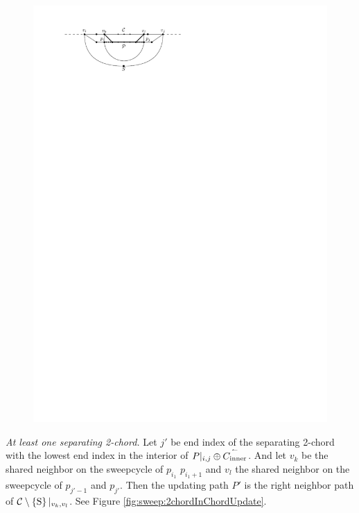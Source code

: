     \begin{figure}[h]
      \centering
      \includegraphics[scale=1]{unifiedAlgo/img/sweep/chordUpdate}
      \caption{}
      \label{fig:sweep:chordUpdate}
    \end{figure}

    \emph{At least one separating 2-chord.}
      Let $j'$ be end index of the separating 2-chord with the lowest end index in the interior of $P|_{i, j} \oplus \accentset{\leftharpoonup}{{C_\text{inner}}}$. And let $v_k$ be the shared neighbor on the sweepcycle of $p_{i_1}$ $p_{i_1 +1}$ and $v_l$ the shared neighbor on the sweepcycle  of $p_{j' -1}$ and $p_{j'}$.
      Then the updating path $P'$ is the right neighbor path of $\mathcal{C} \setminus \left\lbrace {\mathrm{S}} \right\rbrace|_{v_k, v_l}$. See Figure \ref{fig:sweep:2chordInChordUpdate}.

